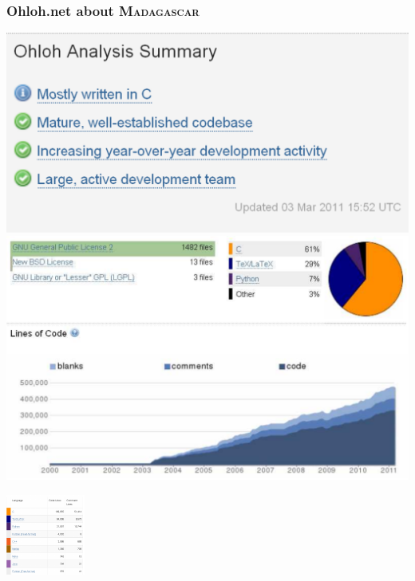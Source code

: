 \begin{frame}
\MadLogo
  \frametitle{Ohloh.net about \textsc{Madagascar}}

\begin{minipage}{0.65\textwidth}
  \includegraphics[height=0.3\textheight]{Fig/ohloh0} 
  \includegraphics[width=\textwidth]{Fig/ohloh1}
\end{minipage}
\hfill
\begin{minipage}{0.3\textwidth}
  \includegraphics[width=\textwidth]{Fig/ohloh2}   
\end{minipage}

\end{frame}

